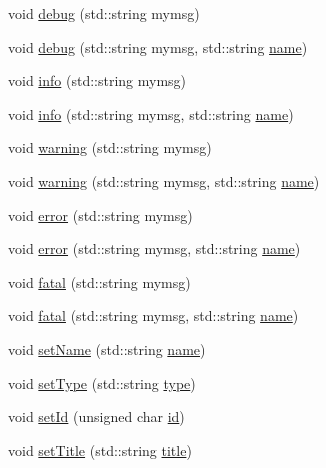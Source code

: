 \begin{DoxyCompactItemize}
\item 
void \hyperlink{classObject_aac010553f022165573714b7014a15f0d}{debug} (std\+::string mymsg)
\item 
void \hyperlink{classObject_a6c9a0397ca804e04d675ed05683f5420}{debug} (std\+::string mymsg, std\+::string \hyperlink{classObject_a300f4c05dd468c7bb8b3c968868443c1}{name})
\item 
void \hyperlink{classObject_a644fd329ea4cb85f54fa6846484b84a8}{info} (std\+::string mymsg)
\item 
void \hyperlink{classObject_a1ca123253dfd30fc28b156f521dcbdae}{info} (std\+::string mymsg, std\+::string \hyperlink{classObject_a300f4c05dd468c7bb8b3c968868443c1}{name})
\item 
void \hyperlink{classObject_a65cd4fda577711660821fd2cd5a3b4c9}{warning} (std\+::string mymsg)
\item 
void \hyperlink{classObject_a11f101db4dd73d9391b0231818881d86}{warning} (std\+::string mymsg, std\+::string \hyperlink{classObject_a300f4c05dd468c7bb8b3c968868443c1}{name})
\item 
void \hyperlink{classObject_a204a95f57818c0f811933917a30eff45}{error} (std\+::string mymsg)
\item 
void \hyperlink{classObject_ad7f6c457733082efa2f9ff5f5c8e119a}{error} (std\+::string mymsg, std\+::string \hyperlink{classObject_a300f4c05dd468c7bb8b3c968868443c1}{name})
\item 
void \hyperlink{classObject_aad5a16aac7516ce65bd5ec02ab07fc80}{fatal} (std\+::string mymsg)
\item 
void \hyperlink{classObject_ae62acd3d09f716220f75f252dc38bc9a}{fatal} (std\+::string mymsg, std\+::string \hyperlink{classObject_a300f4c05dd468c7bb8b3c968868443c1}{name})
\item 
void \hyperlink{classObject_ae30fea75683c2d149b6b6d17c09ecd0c}{set\+Name} (std\+::string \hyperlink{classObject_a300f4c05dd468c7bb8b3c968868443c1}{name})
\item 
void \hyperlink{classObject_aae534cc9d982bcb9b99fd505f2e103a5}{set\+Type} (std\+::string \hyperlink{classObject_a84f99f70f144a83e1582d1d0f84e4e62}{type})
\item 
void \hyperlink{classObject_a398fe08cba594a0ce6891d59fe4f159f}{set\+Id} (unsigned char \hyperlink{classObject_af99145335cc61ff6e2798ea17db009d2}{id})
\item 
void \hyperlink{classObject_a89557dbbad5bcaa02652f5d7fa35d20f}{set\+Title} (std\+::string \hyperlink{classObject_a73a0f1a41828fdd8303dd662446fb6c3}{title})
\item 

\end{DoxyCompactItemize}
